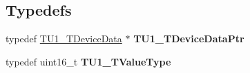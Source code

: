\subsection*{Typedefs}
\begin{DoxyCompactItemize}
\item 
\mbox{\label{group___t_u1__module_ga992897b60934aa5b8d6edb262c3bba55}} 
typedef \hyperlink{struct_t_u1___t_device_data}{T\+U1\+\_\+\+T\+Device\+Data} $\ast$ {\bfseries T\+U1\+\_\+\+T\+Device\+Data\+Ptr}
\item 
\mbox{\label{group___t_u1__module_ga10e196ba4fbf739bb461e1e9379ab405}} 
typedef uint16\+\_\+t {\bfseries T\+U1\+\_\+\+T\+Value\+Type}
\end{DoxyCompactItemize}
